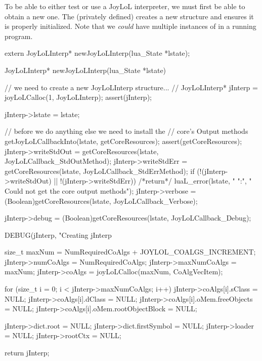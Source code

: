 \startTestSuite[newJoyLoLInterp]

To be able to either test or use a JoyLoL interpreter, we must first be 
able to obtain a new one. The (privately defined)  
creates a new  structure and ensures it is properly 
initialized. Note that we \emph{could} have multiple instances of 
 in a running program. 

\startCHeader
extern JoyLoLInterp* newJoyLoLInterp(lua_State *lstate);
\stopCHeader
{}

\startCCode
JoyLoLInterp* newJoyLoLInterp(lua_State *lstate) {
  // we need to create a new JoyLoLInterp structure...
  //
  JoyLoLInterp* jInterp = joyLoLCalloc(1, JoyLoLInterp);
  assert(jInterp);

  jInterp->lstate = lstate;
  
  // before we do anything else we need to install the
  // core's Output methods
  getJoyLoLCallbackInto(lstate, getCoreResources);
  assert(getCoreResources);
  jInterp->writeStdOut =
    getCoreResources(lstate, JoyLoLCallback_StdOutMethod);
  jInterp->writeStdErr =
    getCoreResources(lstate, JoyLoLCallback_StdErrMethod);
  if (!(jInterp->writeStdOut) || !(jInterp->writeStdErr)) {
    /*return*/ luaL_error(lstate, "%
      "\nERROR:\n",
      "  Could not get the core output methods\n");
  }
  jInterp->verbose = 
    (Boolean)getCoreResources(lstate, JoyLoLCallback_Verbose);
    
  jInterp->debug = 
    (Boolean)getCoreResources(lstate, JoyLoLCallback_Debug);

  DEBUG(jInterp, "Creating jInterp %
    
  size_t maxNum =
    NumRequiredCoAlgs + JOYLOL_COALGS_INCREMENT;
  jInterp->numCoAlgs    = NumRequiredCoAlgs;
  jInterp->maxNumCoAlgs = maxNum;
  jInterp->coAlgs    = joyLoLCalloc(maxNum, CoAlgVecItem);
  
  for (size_t i = 0; i < jInterp->maxNumCoAlgs; i++) {
    jInterp->coAlgs[i].sClass               = NULL;
    jInterp->coAlgs[i].dClass               = NULL;
    jInterp->coAlgs[i].oMem.freeObjects     = NULL;
    jInterp->coAlgs[i].oMem.rootObjectBlock = NULL; 
  }
  
  jInterp->dict.root        = NULL;
  jInterp->dict.firstSymbol = NULL;
  jInterp->loader           = NULL;
  jInterp->rootCtx          = NULL;
    
  return jInterp;
}
\stopCCode

